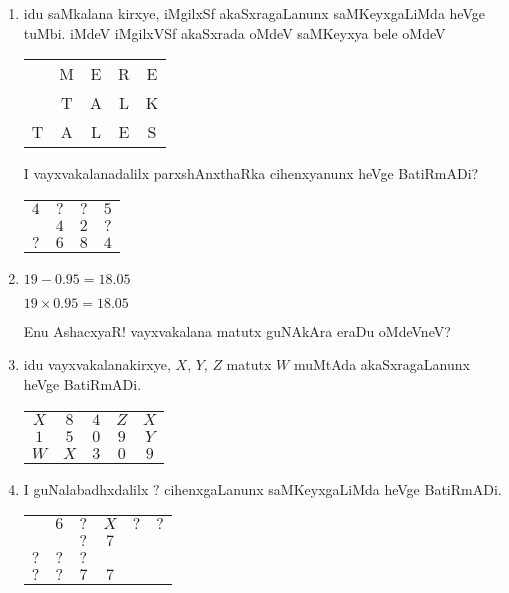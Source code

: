 \begin{enumerate}
\item idu saMkalana kirxye, iMgilxSf akaSxragaLanunx saMKeyxgaLiMda heVge tuMbi. iMdeV iMgilxVSf akaSxrada oMdeV saMKeyxya bele oMdeV
\begin{center}
\begin{tabular}{ccccc}
 & {\rm M} & {\rm E} & {\rm R} & {\rm E}\\
 & {\rm T} & {\rm A} & {\rm L} & {\rm K}\\
\hline
{\rm T} & {\rm A} & {\rm L} & {\rm E} & {\rm S}
\end{tabular}
\end{center}

I vayxvakalanadalilx parxshAnxthaRka cihenxyanunx heVge BatiRmADi?
\begin{center}
\begin{tabular}{cccc}
$4$ & $?$ & $?$ & $5$\\
& $4$ & $2$ & $?$\\
\hline
$?$ & $6$ & $8$ & $4$
\end{tabular}
\end{center}

\item $19-0.95=18.05$

$19\times 0.95=18.05$

Enu AshacxyaR! vayxvakalana matutx guNAkAra eraDu oMdeVneV?

\item idu vayxvakalanakirxye, $X$, $Y$, $Z$ matutx $W$ muMtAda akaSxragaLanunx heVge BatiRmADi.
\begin{center}
\begin{tabular}{ccccc}
$X$ & $8$ & $4$ & $Z$ & $X$\\
$1$ & $5$ & $0$ & $9$ & $Y$\\
\hline
$W$ & $X$ & $3$ & $0$ & $9$
\end{tabular}
\end{center}

\item I guNalabadhxdalilx $?$ cihenxgaLanunx saMKeyxgaLiMda heVge BatiRmADi.
\begin{center}
\begin{tabular}{cccccc}
 & $6$ & $?$ & $X$ & $?$ & $?$\\
\cline{2-6}
& & $?$ & $7$ & & \\
$?$ & $?$ & $?$ &  & \\
\hline
$?$ & $?$ & $7$ & $7$ &&
\end{tabular}
\end{center}



\end{enumerate}
